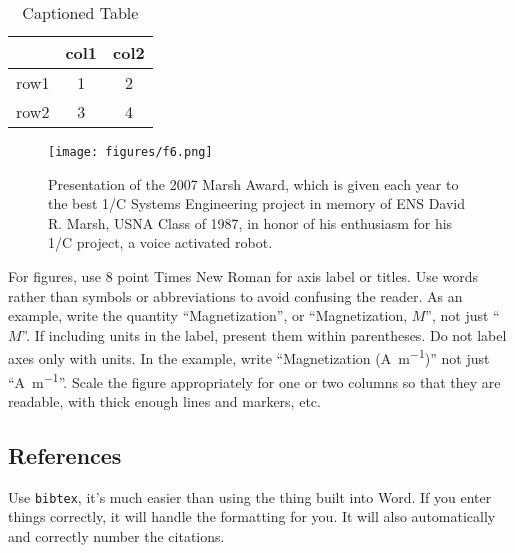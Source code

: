 \documentclass{wrcecapstone}
\begin{document}
\begin{table}[hpt]
\caption{Captioned Table}
\label{t1}
\begin{center}
\begin{tabular}{lcc}
\toprule
 & col1 & col2 \\
\midrule
row1 & 1 & 2 \\
row2 & 3 & 4 \\
\bottomrule
\end{tabular}
\end{center}
\end{table}

\begin{figure}[hpb]
\begin{center}
\texttt{[image: figures/f6.png]}
\end{center}
\caption{Presentation of the 2007 Marsh Award, which is given each year to the best 1/C Systems Engineering project in memory of ENS David R.  Marsh, USNA Class of 1987, in honor of his enthusiasm for his 1/C project, a voice activated robot.}
\label{f6}
\end{figure}

For figures, use 8 point Times New Roman for axis label or titles. Use words rather than symbols or abbreviations to avoid confusing the reader. As an example, write the quantity ``Magnetization'', or ``Magnetization, $M$'', not just ``$M$''. If including units in the label, present them within parentheses. Do not label axes only with units. In the example, write ``Magnetization (\si{\ampere\per\meter})'' not just ``\si{\ampere\per\meter}''. Scale the figure appropriately for one or two columns so that they are readable, with thick enough lines and markers, etc. 

\subsection{References}
Use \lstinline{bibtex}, it's much easier than using the thing built into Word. If you enter things correctly, it will handle the formatting for you. It will also automatically and correctly number the citations. 
\end{document}
